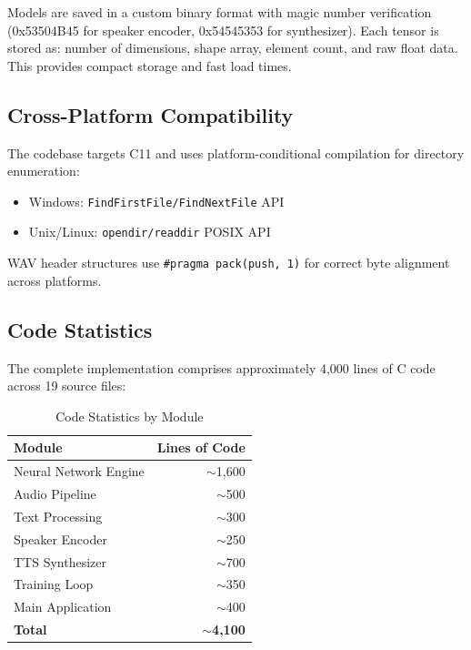 \documentclass[conference]{IEEEtran}
\begin{document}
Models are saved in a custom binary format with magic number verification (0x53504B45 for speaker encoder, 0x54545353 for synthesizer). Each tensor is stored as: number of dimensions, shape array, element count, and raw float data. This provides compact storage and fast load times.

\subsection{Cross-Platform Compatibility}

The codebase targets C11 and uses platform-conditional compilation for directory enumeration:

\begin{itemize}
\item Windows: \texttt{FindFirstFile/FindNextFile} API
\item Unix/Linux: \texttt{opendir/readdir} POSIX API
\end{itemize}

WAV header structures use \texttt{\#pragma pack(push, 1)} for correct byte alignment across platforms.

\subsection{Code Statistics}

The complete implementation comprises approximately 4,000 lines of C code across 19 source files:

\begin{table}[htbp]
\caption{Code Statistics by Module}
\label{tab:code_stats}
\centering
\begin{tabular}{@{}lr@{}}
\toprule
\textbf{Module} & \textbf{Lines of Code} \\
\midrule
Neural Network Engine & $\sim$1,600 \\
Audio Pipeline & $\sim$500 \\
Text Processing & $\sim$300 \\
Speaker Encoder & $\sim$250 \\
TTS Synthesizer & $\sim$700 \\
Training Loop & $\sim$350 \\
Main Application & $\sim$400 \\
\midrule
\textbf{Total} & $\sim$\textbf{4,100} \\
\bottomrule
\end{tabular}
\end{table}
\end{document}
